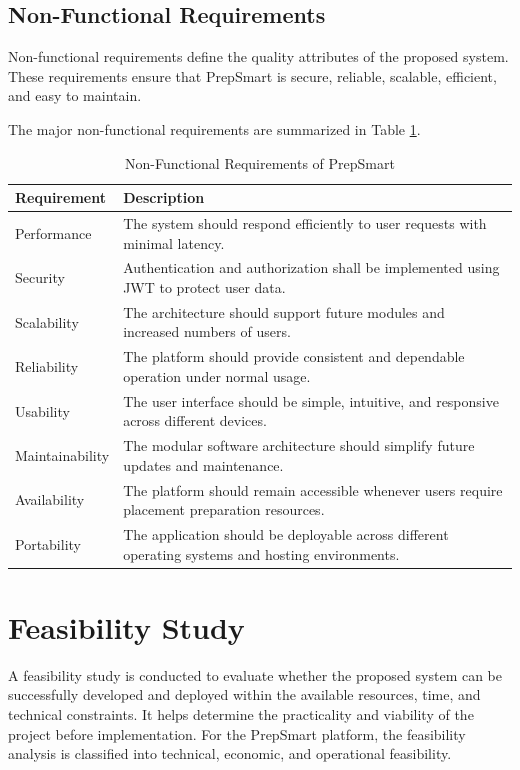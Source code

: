 \subsection{Non-Functional Requirements}

Non-functional requirements define the quality attributes of the proposed system. These requirements ensure that PrepSmart is secure, reliable, scalable, efficient, and easy to maintain.

The major non-functional requirements are summarized in Table \ref{tab:nonfunctional_requirements}.

\begin{table}[H]
\centering
\caption{Non-Functional Requirements of PrepSmart}
\label{tab:nonfunctional_requirements}
\renewcommand{\arraystretch}{1.3}
\begin{tabular}{|p{3cm}|p{11cm}|}
\hline
\textbf{Requirement} & \textbf{Description} \\
\hline
Performance & The system should respond efficiently to user requests with minimal latency. \\
\hline
Security & Authentication and authorization shall be implemented using JWT to protect user data. \\
\hline
Scalability & The architecture should support future modules and increased numbers of users. \\
\hline
Reliability & The platform should provide consistent and dependable operation under normal usage. \\
\hline
Usability & The user interface should be simple, intuitive, and responsive across different devices. \\
\hline
Maintainability & The modular software architecture should simplify future updates and maintenance. \\
\hline
Availability & The platform should remain accessible whenever users require placement preparation resources. \\
\hline
Portability & The application should be deployable across different operating systems and hosting environments. \\
\hline
\end{tabular}
\end{table}

\section{Feasibility Study}

A feasibility study is conducted to evaluate whether the proposed system can be successfully developed and deployed within the available resources, time, and technical constraints. It helps determine the practicality and viability of the project before implementation. For the PrepSmart platform, the feasibility analysis is classified into technical, economic, and operational feasibility.

